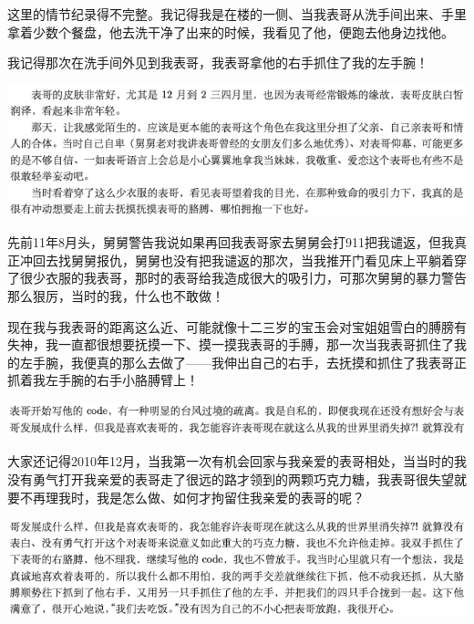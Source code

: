 \documentclass[9pt, b5paper]{article}
\begin{document}
这里的情节纪录得不完整。我记得我是在楼的一侧、当我表哥从洗手间出来、手里拿着少数个餐盘，他去洗干净了出来的时候，我看见了他，便跑去他身边找他。

我记得那次在洗手间外见到我表哥，我表哥拿他的右手抓住了我的左手腕！

\begin{center}
\includegraphics[width=.9\linewidth]{./pic/backups_plans_20210506_100437.png}
\end{center}

先前11年8月头，舅舅警告我说如果再回我表哥家去舅舅会打911把我谴返，但我真正冲回去找舅舅报仇，舅舅也没有把我谴返的那次，当我推开门看见床上平躺着穿了很少衣服的我表哥，那时的表哥给我造成很大的吸引力，可那次舅舅的暴力警告那么狠厉，当时的我，什么也不敢做！

现在我与我表哥的距离这么近、可能就像十二三岁的宝玉会对宝姐姐雪白的膊膀有失神，我一直都很想要抚摸一下、摸一摸我表哥的手膊，那一次当我表哥抓住了我的左手腕，我便真的那么去做了——我伸出自己的右手，去抚摸和抓住了我表哥正抓着我左手腕的右手小胳膊臂上！

\begin{center}
\includegraphics[width=.9\linewidth]{./pic/backups_plans_20210506_110001.png}
\end{center}

大家还记得2010年12月，当我第一次有机会回家与我亲爱的表哥相处，当当时的我没有勇气打开我亲爱的表哥走了很远的路才领到的两颗巧克力糖，我表哥很失望就要不再理我时，我是怎么做、如何才拘留住我亲爱的表哥的呢？

\begin{center}
\includegraphics[width=.9\linewidth]{./pic/backups_plans_20210506_203024.png}
\end{center}
\end{document}
